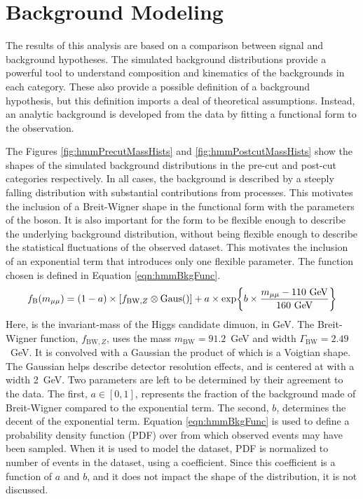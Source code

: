 \section{Background Modeling}\label{sec:hmmBkg}

The results of this analysis are based on a comparison between signal and background hypotheses.
The simulated background distributions provide a powerful tool to understand composition and kinematics of the backgrounds in each category.  
These also provide a possible definition of a background hypothesis, but this definition imports a deal of theoretical assumptions.
Instead, an analytic background is developed from the data by fitting a functional form to the observation.

The Figures \ref{fig:hmmPrecutMassHists} and \ref{fig:hmmPostcutMassHists} show the \muu shapes of the simulated background distributions in the pre-cut and post-cut categories respectively.
In all cases, the background is described by a steeply falling \muu distribution with substantial contributions from \Z processes.
This motivates the inclusion of a Breit-Wigner shape in the functional form with the parameters of the \Z boson.
It is also important for the form to be flexible enough to describe the underlying background distribution, without being flexible enough to describe the statistical fluctuations of the observed dataset.
This motivates the inclusion of an exponential term that introduces only one flexible parameter.
The function chosen is defined in Equation \ref{eqn:hmmBkgFunc}. 
\begin{equation}\begin{split}\label{eqn:hmmBkgFunc}
    f_\text{B}(\muu) = (1-a)\times [f_{\text{BW},Z}\otimes\text{Gaus}()]+a\times\exp{b\times\frac{\muu-110\text{ GeV}}{160\text{ GeV}}}
\end{split}\end{equation} 
Here, \muu is the invariant-mass of the Higgs candidate dimuon, in GeV.
The Breit-Wigner function, $f_{\text{BW},Z}$, uses the \Z mass $m_\text{BW}=91.2$~GeV and width $\Gamma_\text{BW}=2.49$~GeV.
It is convolved with a Gaussian  the product of which is a Voigtian shape.
The Gaussian helps describe detector resolution effects, and is centered at \muu with a width 2~GeV.
Two parameters are left to be determined by their agreement to the data.
The first, $a\in[0,1]$, represents the fraction of the background made of Breit-Wigner compared to the exponential term.
The second, $b$, determines the decent of the exponential term.
Equation \ref{eqn:hmmBkgFunc} is used to define a probability density function (PDF) over \mll from which observed events may have been sampled. 
When it is used to model the dataset, PDF is normalized to number of events in the dataset, using a coefficient.
Since this coefficient is a function of $a$ and $b$, and it does not impact the shape of the distribution, it is not discussed.

